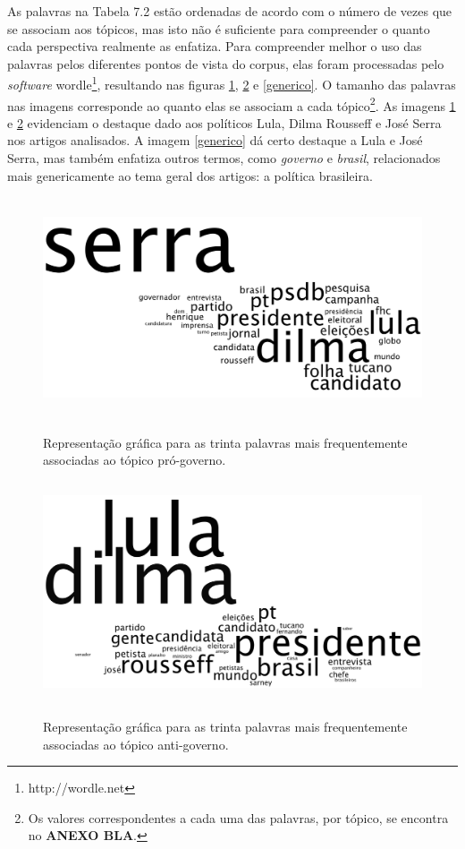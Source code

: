 As palavras na Tabela 7.2 estão ordenadas de acordo com o número de vezes que se associam aos tópicos, mas isto não é suficiente para compreender o quanto cada perspectiva realmente as enfatiza. Para compreender melhor o uso das palavras pelos diferentes pontos de vista do corpus, elas foram processadas pelo \emph{software} wordle\footnote{http://wordle.net}, resultando nas figuras \ref{situacao}, \ref{oposicao} e \ref{generico}. O tamanho das palavras nas imagens corresponde ao quanto elas se associam a cada tópico\footnote{Os valores correspondentes a cada uma das palavras, por tópico, se encontra no \textbf{ANEXO BLA}.}. As imagens \ref{situacao} e \ref{oposicao} evidenciam o destaque dado aos políticos Lula, Dilma Rousseff e José Serra nos artigos analisados. A imagem \ref{generico} dá certo destaque a Lula e José Serra, mas também enfatiza outros termos, como \emph{governo} e \emph{brasil}, relacionados mais genericamente ao tema geral dos artigos: a política brasileira.


\begin{figure}[h]
  \centering %
  \includegraphics[width=12.5cm, height=6.5cm]{situacao.png}\\
  \caption{Representação gráfica para as trinta palavras mais frequentemente associadas ao tópico pró-governo.}
  \label{situacao}
\end{figure}

\begin{figure}[h]
  \centering %
  \includegraphics[width=12.5cm, height=6.5cm]{oposicao.png}\\
  \caption{Representação gráfica para as trinta palavras mais frequentemente associadas ao tópico anti-governo.}
  \label{oposicao}
\end{figure}



